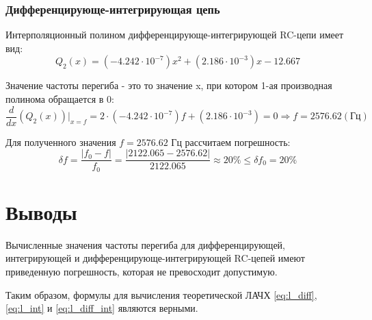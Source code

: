 \documentclass[a4paper,14pt]{extarticle}
\begin{document}
\subsubsection{Дифференцирующе-интегрирующая цепь}

Интерполяционный полином дифференцирующе-интегрирующей RC-цепи имеет вид:\\
\[
Q_2(x) = (-4.242 \cdot 10^{-7})x^2 + (2.186 \cdot 10^{-3})x - 12.667
\]

Значение частоты перегиба - это то значение x, при котором 1-ая производная полинома обращается в 0:
\[
\frac{d}{dx} (Q_2(x))\Big|_{x=f} = 2 \cdot (-4.242 \cdot 10^{-7})f + (2.186 \cdot 10^{-3}) = 0 \Rightarrow f = 2576.62 (\text{Гц})
\]

Для полученного значения $f = 2576.62$ Гц рассчитаем погрешность:
\[
\delta f = \frac{|f_0 - f|}{f_0} = \frac{|2122.065 - 2576.62|}{2122.065} \approx 20 \% \leq \delta f_0 = 20\%
\]
  
\section{Выводы}

Вычисленные значения частоты перегиба для дифференцирующей, интегрирующей и дифференцирующе-интегрирующей RC-цепей имеют приведенную погрешность, которая не превосходит допустимую. 

Таким образом, формулы для вычисления теоретической ЛАЧХ \ref{eq:l_diff}, \ref{eq:l_int} и \ref{eq:l_diff_int} являются верными.
\end{document}
